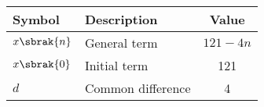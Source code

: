 \begin{tabular}{|l|l|c|}
\hline
\textbf{Symbol} & \textbf{Description} & \textbf{Value} \\
\hline
$x\sbrak{n}$ & General term & \(121 - 4n\) \\
\hline
$x\sbrak{0}$ & Initial term & 121 \\
\hline
$d$ & Common difference & 4 \\
\hline
\end{tabular}
